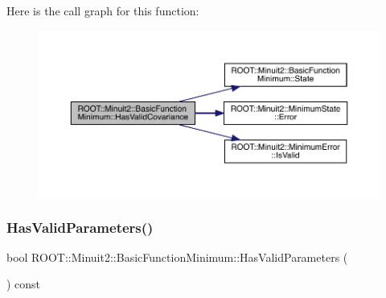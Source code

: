 Here is the call graph for this function\+:
\nopagebreak
\begin{figure}[H]
\begin{center}
\leavevmode
\includegraphics[width=350pt]{de/d25/classROOT_1_1Minuit2_1_1BasicFunctionMinimum_a2bf14deac281ae646e88a2fa6d0b5012_cgraph}
\end{center}
\end{figure}
\mbox{\label{classROOT_1_1Minuit2_1_1BasicFunctionMinimum_a91fedd04974dd5d27981eb758405670f}} 
\subsubsection{\texorpdfstring{HasValidParameters()}{HasValidParameters()}\hspace{0.1cm}{\footnotesize\ttfamily [1/3]}}
{\footnotesize\ttfamily bool R\+O\+O\+T\+::\+Minuit2\+::\+Basic\+Function\+Minimum\+::\+Has\+Valid\+Parameters (\begin{DoxyParamCaption}{ }\end{DoxyParamCaption}) const\hspace{0.3cm}{\ttfamily [inline]}}


